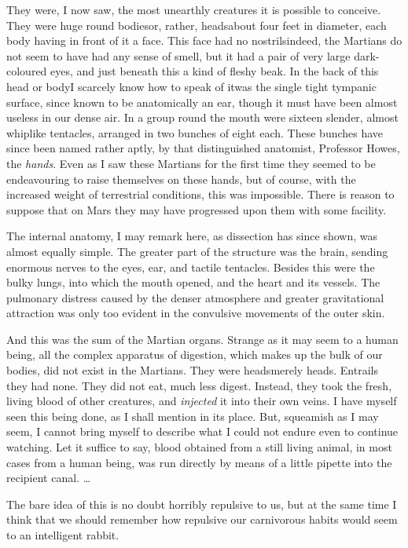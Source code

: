 They were, I now saw, the most unearthly creatures it is possible
to conceive. They were huge round bodies\dash{}or, rather, heads\dash{}about
four feet in diameter, each body having in front of it a face. This
face had no nostrils\dash{}indeed, the Martians do not seem to have had
any sense of smell, but it had a pair of very large dark-coloured
eyes, and just beneath this a kind of fleshy beak. In the back of
this head or body\dash{}I scarcely know how to speak of it\dash{}was the
single tight tympanic surface, since known to be anatomically an
ear, though it must have been almost useless in our dense air. In a
group round the mouth were sixteen slender, almost whiplike
tentacles, arranged in two bunches of eight each. These bunches
have since been named rather aptly, by that distinguished
anatomist, Professor Howes, the \emph{hands}. Even as I saw these
Martians for the first time they seemed to be endeavouring to raise
themselves on these hands, but of course, with the increased weight
of terrestrial conditions, this was impossible. There is reason to
suppose that on Mars they may have progressed upon them with some
facility.

The internal anatomy, I may remark here, as dissection has since
shown, was almost equally simple. The greater part of the structure
was the brain, sending enormous nerves to the eyes, ear, and
tactile tentacles. Besides this were the bulky lungs, into which
the mouth opened, and the heart and its vessels. The pulmonary
distress caused by the denser atmosphere and greater gravitational
attraction was only too evident in the convulsive movements of the
outer skin.

And this was the sum of the Martian organs. Strange as it may seem
to a human being, all the complex apparatus of digestion, which
makes up the bulk of our bodies, did not exist in the Martians.
They were heads\dash{}merely heads. Entrails they had none. They did not
eat, much less digest. Instead, they took the fresh, living blood
of other creatures, and \emph{injected} it into their own veins. I
have myself seen this being done, as I shall mention in its place.
But, squeamish as I may seem, I cannot bring myself to describe
what I could not endure even to continue watching. Let it suffice
to say, blood obtained from a still living animal, in most cases
from a human being, was run directly by means of a little pipette
into the recipient canal. \ldots{}

The bare idea of this is no doubt horribly repulsive to us, but at
the same time I think that we should remember how repulsive our
carnivorous habits would seem to an intelligent rabbit.

